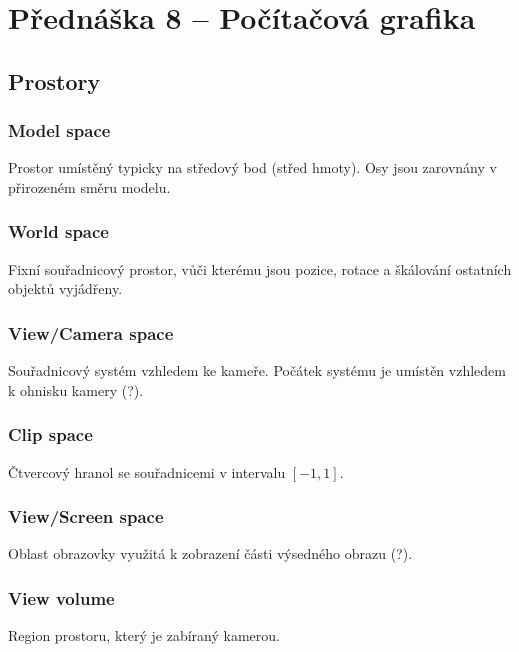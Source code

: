 \section{Přednáška 8 -- Počítačová grafika}

\subsection*{Prostory}

\subsubsection*{Model space}

Prostor umístěný typicky na středový bod (střed hmoty).
Osy jsou zarovnány v přirozeném směru modelu.

\subsubsection*{World space}

Fixní souřadnicový prostor, vůči kterému jsou pozice, rotace a škálování ostatních objektů vyjádřeny.

\subsubsection*{View/Camera space}

Souřadnicový systém vzhledem ke kameře.
Počátek systému je umístěn vzhledem k ohnisku kamery (?).

\subsubsection*{Clip space}

Čtvercový hranol se souřadnicemi v intervalu \([-1, 1]\).

\subsubsection*{View/Screen space}

Oblast obrazovky využitá k zobrazení části výsedného obrazu (?).


\subsubsection*{View volume}

Region prostoru, který je zabíraný kamerou.

